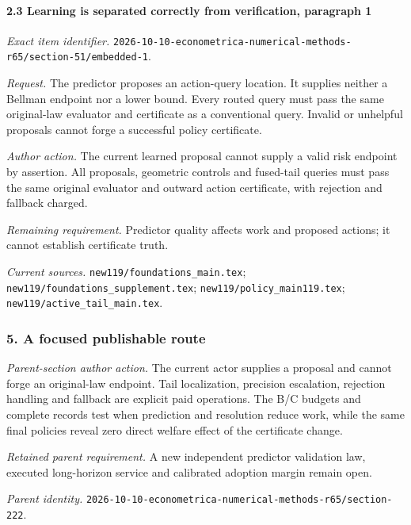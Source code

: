\paragraph{2.3 Learning is separated correctly from verification, paragraph 1}

\emph{Exact item identifier.} \nolinkurl{2026-10-10-econometrica-numerical-methods-r65/section-51/embedded-1}.

\par\emph{Request.} The predictor proposes an action-query location. It supplies neither a Bellman endpoint nor a lower bound. Every routed query must pass the same original-law evaluator and certificate as a conventional query. Invalid or unhelpful proposals cannot forge a successful policy certificate.

\par\emph{Author action.} The current learned proposal cannot supply a valid risk endpoint by assertion. All proposals, geometric controls and fused-tail queries must pass the same original evaluator and outward action certificate, with rejection and fallback charged.

\par\emph{Remaining requirement.} Predictor quality affects work and proposed actions; it cannot establish certificate truth.

\par\emph{Current sources.} \nolinkurl{new119/foundations_main.tex}; \nolinkurl{new119/foundations_supplement.tex}; \nolinkurl{new119/policy_main119.tex}; \nolinkurl{new119/active_tail_main.tex}.

\subsubsection{5. A focused publishable route}

\emph{Parent-section author action.} The current actor supplies a proposal and cannot forge an original-law endpoint. Tail localization, precision escalation, rejection handling and fallback are explicit paid operations. The B/\allowbreak{}C budgets and complete records test when prediction and resolution reduce work, while the same final policies reveal zero direct welfare effect of the certificate change.

\par\emph{Retained parent requirement.} A new independent predictor validation law, executed long-horizon service and calibrated adoption margin remain open.

\par\emph{Parent identity.} \nolinkurl{2026-10-10-econometrica-numerical-methods-r65/section-222}.

